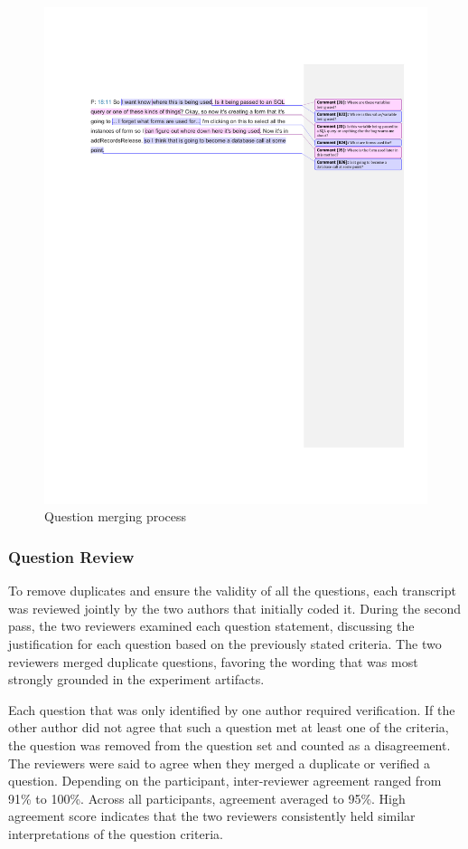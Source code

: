 \documentclass[conference]{IEEEtran}
\begin{document}
\begin{figure}
\centering
\includegraphics[width=7.5in]{Images/QuestionMerging}
\caption{Question merging process}
\label{fig:merging} 
\end{figure}

\subsubsection{Question Review}
To remove duplicates and ensure the validity of all the questions, each transcript was reviewed jointly by the two authors that initially coded it.
During the second pass, the two reviewers examined each question statement, discussing the justification for each question based on the previously stated criteria.
The two reviewers merged duplicate questions, favoring the wording that was most strongly grounded in the experiment artifacts.

Each question that was only identified by one author required verification.
If the other author did not agree that such a question met at least one of the criteria, the question was removed from the question set and counted as a disagreement.
The reviewers were said to agree when they merged a duplicate or verified a question. Depending on the participant, inter-reviewer agreement ranged from 91\% to 100\%. Across all participants, agreement averaged to 95\%.
High agreement score indicates that the two reviewers consistently held similar interpretations of the question criteria.
\end{document}
